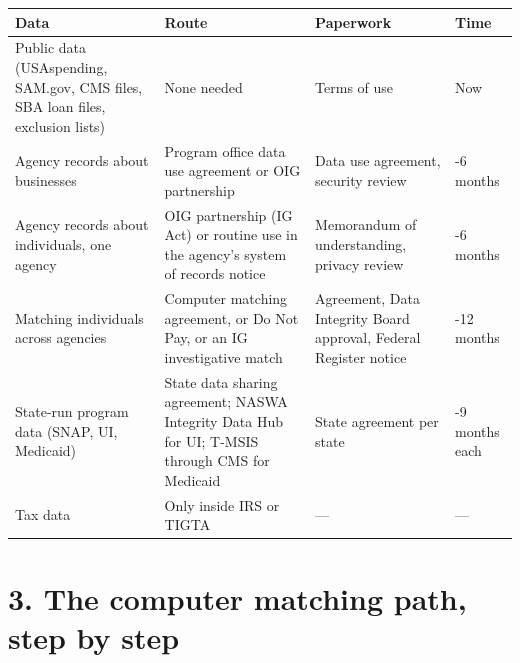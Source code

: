 \documentclass[letterpaper,11pt]{article}
\begin{document}
\begingroup\small\setlength{\tabcolsep}{4pt}\renewcommand{\arraystretch}{1.25}
\begin{longtable}[l]{@{}>{\raggedright\arraybackslash}p{}>{\raggedright\arraybackslash}p{}>{\raggedright\arraybackslash}p{}>{\raggedright\arraybackslash}p{}@{}}
\rowcolor{coolblack}\leavevmode\color{white}\bfseries Data & \leavevmode\color{white}\bfseries Route & \leavevmode\color{white}\bfseries Paperwork & \leavevmode\color{white}\bfseries Time \\
\endhead
Public data (USAspending, SAM.gov, CMS files, SBA loan files, exclusion lists) & None needed & Terms of use & Now \\
Agency records about businesses & Program office data use agreement or OIG partnership & Data use agreement, security review & 2-6 months \\
Agency records about individuals, one agency & OIG partnership (IG Act) or routine use in the agency's system of records notice & Memorandum of understanding, privacy review & 3-6 months \\
Matching individuals across agencies & Computer matching agreement, or Do Not Pay, or an IG investigative match & Agreement, Data Integrity Board approval, Federal Register notice & 6-12 months \\
State-run program data (SNAP, UI, Medicaid) & State data sharing agreement; NASWA Integrity Data Hub for UI; T-MSIS through CMS for Medicaid & State agreement per state & 3-9 months each \\
Tax data & Only inside IRS or TIGTA & --- & --- \\
\end{longtable}\endgroup

\hypertarget{the-computer-matching-path-step-by-step}{%
\section*{3. The computer matching path, step by
step}\label{the-computer-matching-path-step-by-step}}
\end{document}
